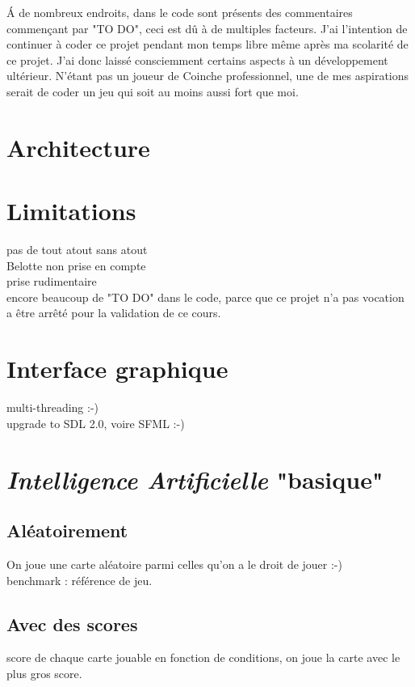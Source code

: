 \documentclass[a4paper,11pt]{article}
\begin{document}
\'A de nombreux endroits, dans le code sont présents des commentaires commençant par "TO DO", ceci est dû à de multiples facteurs. J'ai l'intention de continuer à coder ce projet pendant mon temps libre même après ma scolarité de ce projet. J'ai donc laissé consciemment certains aspects à un développement ultérieur. N'étant pas un joueur de Coinche professionnel, une de mes aspirations serait de coder un jeu qui soit au moins aussi fort que moi. \\

\clearpage
\section{Architecture}


\clearpage
\section{Limitations}
pas de tout atout sans atout \\

Belotte non prise en compte \\

prise rudimentaire \\

encore beaucoup de "TO DO" dans le code, parce que ce projet n'a pas vocation a être arrêté pour la validation de ce cours.
\clearpage
\section{Interface graphique}
multi-threading :-) \\

upgrade to SDL 2.0, voire SFML :-)

\clearpage
\section{\textit{Intelligence Artificielle} "basique"}
\subsection{Aléatoirement}
On joue une carte aléatoire parmi celles qu'on a le droit de jouer :-)\\

benchmark : référence de jeu.
\subsection{Avec des scores}
score de chaque carte jouable en fonction de conditions, on joue la carte avec le plus gros score. \\
\end{document}
